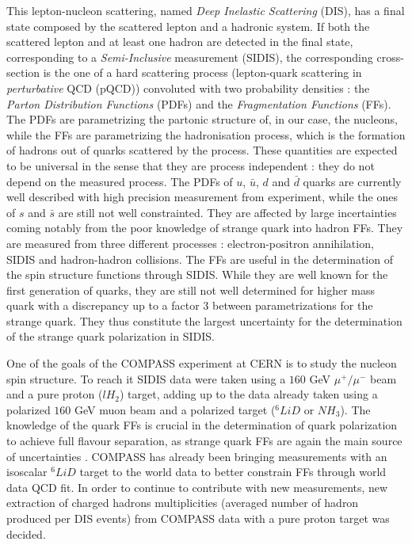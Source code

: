 This lepton-nucleon scattering, named \textit{Deep Inelastic Scattering} (DIS), has a final state composed by the scattered lepton and a hadronic system. If both the scattered lepton and at least one hadron are detected in the final state, corresponding to a \textit{Semi-Inclusive} measurement (SIDIS), the corresponding cross-section is the one of a hard scattering process (lepton-quark scattering in \textit{perturbative} QCD (pQCD)) convoluted with two probability densities : the \textit{Parton Distribution Functions} (PDFs) and the \textit{Fragmentation Functions} (FFs). The PDFs are parametrizing the partonic structure of, in our case, the nucleons, while the FFs are parametrizing the hadronisation process, which is the formation of hadrons out of quarks scattered by the process. These quantities are expected to be universal in the sense that they are process independent : they do not depend on the measured process. The PDFs of $u$, $\bar{u}$, $d$ and $\bar{d}$ quarks are currently well described with high precision measurement from experiment, while the ones of $s$ and $\bar{s}$ are still not well constrainted. They are affected by large incertainties coming notably from the poor knowledge of strange quark into hadron FFs. They are measured from three different processes : electron-positron annihilation, SIDIS and hadron-hadron collisions. The FFs are useful in the determination of the spin structure functions through SIDIS. While they are well known for the first generation of quarks, they are still not well determined for higher mass quark with a discrepancy up to a factor $3$ between parametrizations for the strange quark. They thus constitute the largest uncertainty for the determination of the strange quark polarization in SIDIS.

One of the goals of the COMPASS experiment at CERN is to study the nucleon spin structure. To reach it SIDIS data were taken using a $160$ GeV $\mu^+/\mu^-$ beam and a pure proton ($lH_2$) target, adding up to the data already taken using a polarized $160$ GeV muon beam and a polarized target ($^6LiD$ or $NH_3$). The knowledge of the quark FFs is crucial in the determination of quark polarization to achieve full flavour separation, as strange quark FFs are again the main source of uncertainties \cite{COMPASSstrange}. COMPASS has already been bringing measurements with an isoscalar $^6LiD$ target to the world data to better constrain FFs through world data QCD fit. In order to continue to contribute with new measurements, new extraction of charged hadrons multiplicities (averaged number of hadron produced per DIS events) from COMPASS data with a pure proton target was decided.

